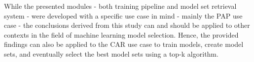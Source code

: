 While the presented modules - both training pipeline and model set retrieval system - were developed with a specific use case in mind - mainly the PAP use case - the conclusions derived from this study can and should be applied to other contexts in the field of machine learning model selection. Hence, the provided findings can also be applied to the CAR use case to train models, create model sets, and eventually select the best model sets using a top-k algorithm.\\
